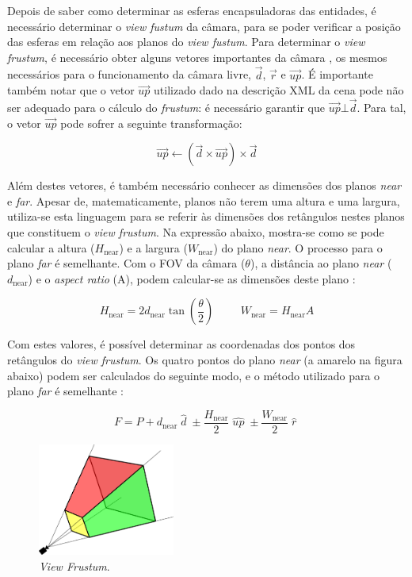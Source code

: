 \documentclass[12pt, a4paper]{article}
\begin{document}
Depois de saber como determinar as esferas encapsuladoras das entidades, é necessário determinar
o \emph{view fustum} da câmara, para se poder verificar a posição das esferas em relação aos planos
do \emph{view fustum}. Para determinar o \emph{view frustum}, é necessário obter alguns vetores
importantes da câmara \cite{lighthouse3d-frustum-planes}, os mesmos necessários para o funcionamento
da câmara livre, $\vec{d}$, $\vec{r}$ e $\vec{up}$. É importante também notar que o vetor $\vec{up}$
utilizado dado na descrição XML da cena pode não ser adequado para o cálculo do \emph{frustum}: é
necessário garantir que $\vec{up} \bot \vec{d}$. Para tal, o vetor $\vec{up}$ pode sofrer a seguinte
transformação:

$$
\vec{up} \leftarrow \left ( \vec{d} \times \vec{up} \right ) \times \vec{d}
$$

Além destes vetores, é também necessário conhecer as dimensões dos planos \emph{near} e \emph{far}.
Apesar de, matematicamente, planos não terem uma altura e uma largura, utiliza-se esta linguagem
para se referir às dimensões dos retângulos nestes planos que constituem o \emph{view frustum}. Na
expressão abaixo, mostra-se como se pode calcular a altura ($H_\text{near}$) e a largura
($W_\text{near}$) do plano \emph{near}. O processo para o plano \emph{far} é semelhante. Com o FOV
da câmara ($\theta$), a distância ao plano \emph{near} ($d_\text{near}$) e o \emph{aspect ratio}
(A), podem calcular-se as dimensões deste plano \cite{lighthouse3d-frustum-distances}:

$$
H_\text{near} = 2 d_\text{near} \tan \left ( \frac{\theta}{2} \right )
\hspace{1cm}
W_\text{near} = H_\text{near} A
$$

Com estes valores, é possível determinar as coordenadas dos pontos dos retângulos do
\emph{view frustum}. Os quatro pontos do plano \emph{near} (a amarelo na figura abaixo) podem ser
calculados do seguinte modo, e o método utilizado para o plano \emph{far} é semelhante
\cite{lighthouse3d-frustum-planes}:

$$
F = P +
    d_\text{near} \; \widehat{d} \; \pm
    \frac{H_\text{near}}{2} \; \widehat{up} \; \pm
    \frac{W_\text{near}}{2} \; \widehat{r} \;
$$

\begin{figure}[H]
    \centering
    \includegraphics[width=0.4\textwidth]{res/phase2/ViewFrustum.pdf}
    \caption{\emph{View Frustum}.}
\end{figure}
\end{document}
